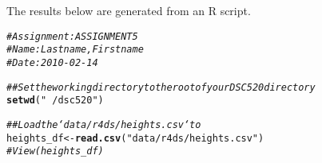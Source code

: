 \documentclass{article}\usepackage[]{graphicx}\usepackage[]{xcolor}
\makeatletter
\newcommand{\hlstr}[1]{\textcolor[rgb]{0.192,0.494,0.8}{#1}}%
\newcommand{\hlcom}[1]{\textcolor[rgb]{0.678,0.584,0.686}{\textit{#1}}}%
\newcommand{\hlstd}[1]{\textcolor[rgb]{0.345,0.345,0.345}{#1}}%
\newcommand{\hlkwb}[1]{\textcolor[rgb]{0.69,0.353,0.396}{#1}}%
\newcommand{\hlkwd}[1]{\textcolor[rgb]{0.737,0.353,0.396}{\textbf{#1}}}%
\newenvironment{kframe}{%
 \def\at@end@of@kframe{}%
 \ifinner\ifhmode%
  \def\at@end@of@kframe{\end{minipage}}%
  \begin{minipage}{\columnwidth}%
 \fi\fi%
 \def\FrameCommand##1{\hskip\@totalleftmargin \hskip-\fboxsep
 \colorbox{shadecolor}{##1}\hskip-\fboxsep
     \hskip-\linewidth \hskip-\@totalleftmargin \hskip\columnwidth}%
 \MakeFramed {\advance\hsize-\width
   \@totalleftmargin\z@ \linewidth\hsize
   \@setminipage}}%
 {\par\unskip\endMakeFramed%
 \at@end@of@kframe}
\newenvironment{knitrout}{}{} %
\makeatother
\begin{document}
\title{\title{\title{\title{\title{}}}}}



\maketitle
The results below are generated from an R script.

\begin{knitrout}
\color{fgcolor}\begin{kframe}
\begin{alltt}
\hlcom{# Assignment: ASSIGNMENT 5}
\hlcom{# Name: Lastname, Firstname}
\hlcom{# Date: 2010-02-14}

\hlcom{## Set the working directory to the root of your DSC 520 directory}
\hlkwd{setwd}\hlstd{(}\hlstr{"~/dsc520"}\hlstd{)}

\hlcom{## Load the `data/r4ds/heights.csv` to}
\hlstd{heights_df} \hlkwb{<-} \hlkwd{read.csv}\hlstd{(}\hlstr{"data/r4ds/heights.csv"}\hlstd{)}
\hlcom{#View(heights_df)}


\end{alltt}
\end{kframe}
\end{knitrout}
\end{document}
